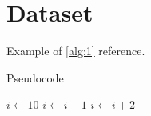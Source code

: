 
\chapter{Dataset}
\label{chp:dataset}

Example of \autoref{alg:1} reference.

\begin{algorithm}
    \caption{Pseudocode}
    \label{alg:1}
    \begin{algorithmic}
        \STATE $i\gets 10$
          \STATE $i\gets i-1$
        \ELSE
            \STATE $i\gets i+2$
          \ENDIF
        \ENDIF 
    \end{algorithmic}
\end{algorithm}